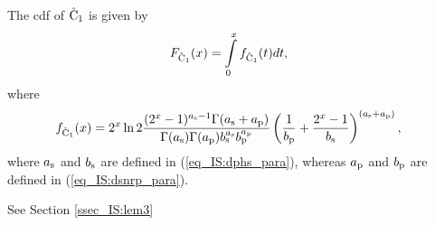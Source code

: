 \begin{lemma} \label{lm_IS:lem3}
\normalfont
The cdf of $\hat{\text{C}}_{\text{1}}$ is given by  
\begin{align}
F_{\hat{\text{C}}_{\text{1}}}(x) &= \int\limits_{0}^{x} f_{\hat{\text{C}}_{\text{1}}}(t) dt, \label{eq_IS:dis_C1} 
\end{align}
where
\begin{align}
f_{\hat{\text{C}}_{\text{1}}}(x) &= 2^x \ln 2 \frac{(2^x - 1)^{a_{\text{s}} - 1} \Gamma(a_{\text{s}} + a_{\text{p}})}{\Gamma(a_{\text{s}}) \Gamma(a_{\text{p}}) b_{\text{s}}^{a_{\text{s}}} b_{\text{p}}^{a_{\text{p}}}} \left(\frac{1}{b_{\text{p}}} + \frac{2^x - 1}{b_{\text{s}}}\right)^{(a_{\text{s}} + a_{\text{p}})}, \label{eq_IS:den_C1}
\end{align}
where $a_{\text{s}}$ and $b_{\text{s}}$ are defined in (\ref{eq_IS:dphs_para}), whereas $a_{\text{p}}$ and $b_{\text{p}}$ are defined in (\ref{eq_IS:dsnrp_para}). 
\end{lemma} 
\begin{IEEEproof}[Solution]
See Section \ref{ssec_IS:lem3}
\end{IEEEproof}

